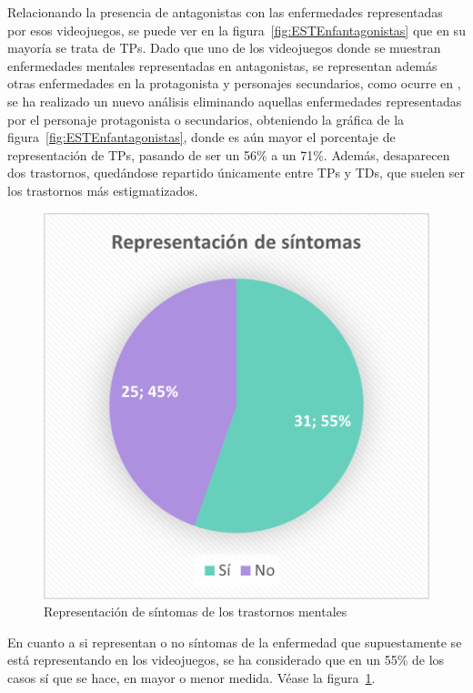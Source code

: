 \documentclass[12pt, a4paper,twoside,titlepage]{book}
\begin{document}
 
Relacionando la presencia de antagonistas con las enfermedades representadas por esos videojuegos, se puede ver en la figura~\ref{fig:ESTEnfantagonistas} que en su mayoría se trata de TPs. Dado que uno de los videojuegos donde se muestran enfermedades mentales representadas en antagonistas, se representan además otras enfermedades en la protagonista y personajes secundarios, como ocurre en , se ha realizado un nuevo análisis eliminando aquellas enfermedades representadas por el personaje protagonista o secundarios, obteniendo la gráfica de la figura~\ref{fig:ESTEnfantagonistas}, donde es aún mayor el porcentaje de representación de TPs, pasando de ser un 56\% a un 71\%. Además, desaparecen dos trastornos, quedándose repartido únicamente entre TPs y TDs, que suelen ser los trastornos más estigmatizados.  


\begin{figure}
    \centering
    \includegraphics[width=.6\linewidth]{Graficas estudio/G15;Sintomas.png}
    \caption{Representación de síntomas de los trastornos mentales}
    \label{fig:ESTSintomas}
\end{figure}


En cuanto a si representan o no síntomas de la enfermedad que supuestamente se está representando en los videojuegos, se ha considerado que en un 55\% de los casos sí que se hace, en mayor o menor medida. Véase la figura~\ref{fig:ESTSintomas}. 
\end{document}
